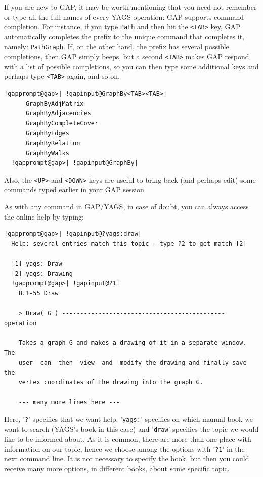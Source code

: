 \documentclass[a4paper,11pt]{report}
\begin{document}
{{If you are new to \textsf{GAP}, it may be worth mentioning that you need not remember or type all the full
names of every \textsf{YAGS} operation: \textsf{GAP} supports command completion. For instance, if you type \texttt{Path} and then hit the \texttt{{\textless}TAB{\textgreater}} key, \textsf{GAP} automatically completes the prefix to the unique command that completes it,
namely: \texttt{PathGraph}. If, on the other hand, the prefix has several possible completions, then \textsf{GAP} simply beeps, but a second \texttt{{\textless}TAB{\textgreater}} makes \textsf{GAP} respond with a list of possible completions, so you can then type some
additional keys and perhaps type \texttt{{\textless}TAB{\textgreater}} again, and so on. 


\begin{Verbatim}[commandchars=!@|,fontsize=\small,frame=single,label=Example]
  !gapprompt@gap>| !gapinput@GraphBy<TAB><TAB>|
      GraphByAdjMatrix
      GraphByAdjacencies
      GraphByCompleteCover
      GraphByEdges
      GraphByRelation
      GraphByWalks
  !gapprompt@gap>| !gapinput@GraphBy|
\end{Verbatim}
 

Also, the \texttt{{\textless}UP{\textgreater}} and \texttt{{\textless}DOWN{\textgreater}} keys are useful to bring back (and perhaps edit) some commands typed earlier
in your \textsf{GAP} session. 

As with any command in \textsf{GAP}/\textsf{YAGS}, in case of doubt, you can always access the online help by typing: 


\begin{Verbatim}[commandchars=!@|,fontsize=\small,frame=single,label=Example]
  !gapprompt@gap>| !gapinput@?yags:draw|
  Help: several entries match this topic - type ?2 to get match [2]
  
  [1] yags: Draw
  [2] yags: Drawing
  !gapprompt@gap>| !gapinput@?1|
    B.1-55 Draw
    
    > Draw( G ) --------------------------------------------- operation
    
    Takes a graph G and makes a drawing of it in a separate window. The
    user  can  then  view  and  modify the drawing and finally save the
    vertex coordinates of the drawing into the graph G.
    
    --- many more lines here ---
\end{Verbatim}
 

Here, '\texttt{?}' specifies that we want help; '\texttt{yags:}' specifies on which manual book we want to search (\textsf{YAGS}'s book in this case) and '\texttt{draw}' specifies the topic we would like to be informed about. As it is common,
there are more than one place with information on our topic, hence we choose
among the options with '\texttt{?1}' in the next command line. It is not necessary to specify the book, but then
you could receive many more options, in different books, about some specific
topic. 

}}
\end{document}
